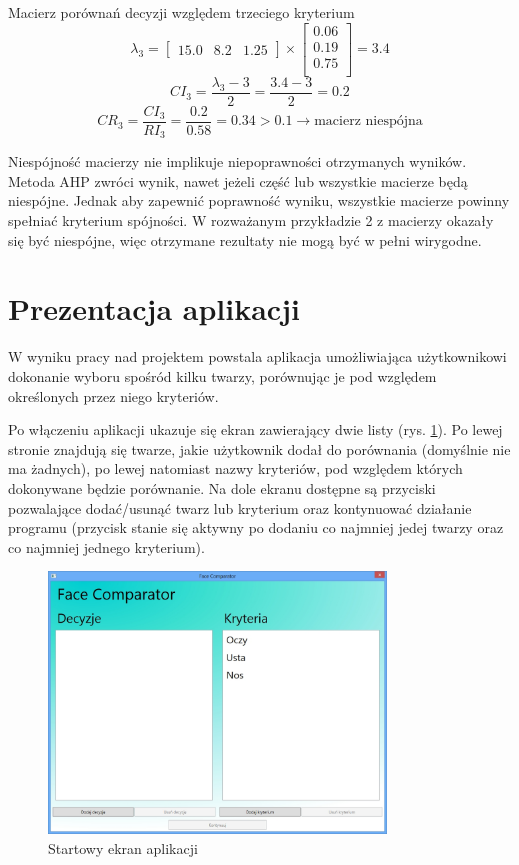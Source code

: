 \documentclass[a4paper,notitlepage]{article}
\begin{document}
Macierz porównań decyzji względem trzeciego kryterium
\[ \lambda_3 = \left[ \begin{array}{ccc} 15.0 & 8.2 & 1.25 \end{array} \right] \times \left[ \begin{array}{c} 0.06\\ 0.19\\ 0.75\\ \end{array} \right] = 3.4 \]
\[ CI_3 = \frac{\lambda_3 - 3}{2} =\frac{3.4 - 3}{2} = 0.2 \]
\[ CR_3 = \frac{CI_3}{RI_3} = \frac{0.2}{0.58} = 0.34 > 0.1 \rightarrow \textrm{macierz niespójna} \]

Niespójność macierzy nie implikuje niepoprawności otrzymanych wyników.
Metoda AHP zwróci wynik, nawet jeżeli część lub wszystkie macierze będą niespójne.
Jednak aby zapewnić poprawność wyniku, wszystkie macierze powinny spełniać kryterium spójności.
W rozważanym przykładzie 2 z macierzy okazały się być niespójne, więc otrzymane rezultaty nie mogą być w pełni wirygodne.

\section{Prezentacja aplikacji}
W wyniku pracy nad projektem powstala aplikacja umożliwiająca użytkownikowi dokonanie wyboru spośród kilku twarzy, porównując je pod względem określonych przez niego kryteriów.

Po włączeniu aplikacji ukazuje się ekran zawierający dwie listy (rys. \ref{img_start_screen}).
Po lewej stronie znajdują się twarze, jakie użytkownik dodał do porównania (domyślnie nie ma żadnych), po lewej natomiast nazwy kryteriów, pod względem których dokonywane będzie porównanie.
Na dole ekranu dostępne są przyciski pozwalające dodać/usunąć twarz lub kryterium oraz kontynuować działanie programu (przycisk stanie się aktywny po dodaniu co najmniej jedej twarzy oraz co najmniej jednego kryterium).
	\begin{figure}[!htp]
	\centering
	\caption{Startowy ekran aplikacji}
	\label{img_start_screen}
	\includegraphics[width=0.8\textwidth]{img/startScreen}
	\end{figure}
\end{document}
